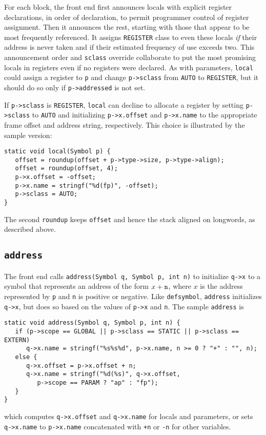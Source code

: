 For each block, the front end first announces locals with explicit
register declarations, in order of declaration, to permit programmer
control of register assignment. Then it announces the rest, starting
with those that appear to be most frequently referenced.  It assigns
\verb|REGISTER| class to even these locals {\em if} their address
is never taken and if their estimated frequency of use exceeds two.
This announcement order and \verb|sclass| override collaborate to put the most
promising locals in registers even if no registers were declared.  As
with parameters, \verb|local| could assign a register to \verb|p| and
change \verb|p->sclass| from \verb|AUTO| to \verb|REGISTER|, but it
should do so only if \verb|p->addressed| is not set.

If \verb|p->sclass| is \verb|REGISTER|, \verb|local|
can decline to allocate a register by setting \verb|p->sclass| to \verb|AUTO|
and initializing \verb|p->x.offset| and \verb|p->x.name| to the appropriate frame offset
and address string, respectively.
This choice is illustrated by the sample version:
\begin{verbatim}
static void local(Symbol p) {
   offset = roundup(offset + p->type->size, p->type->align);
   offset = roundup(offset, 4);
   p->x.offset = -offset;
   p->x.name = stringf("%d(fp)", -offset);
   p->sclass = AUTO;
}
\end{verbatim}
The second \verb|roundup| keeps \verb|offset| and hence the stack
aligned on longwords, as described above.

\subsection{\tt address}

\label{address}
The front end calls \verb|address(Symbol q, Symbol p, int n)| to
initialize \verb|q->x| to a symbol that represents an address of the form $x+{\tt n}$,
where $x$ is the address represented by \verb|p| and \verb|n| is positive or negative.
Like \verb|defsymbol|, \verb|address| initializes \verb|q->x|, but
does so based on the values of \verb|p->x| and \verb|n|.
The sample \verb|address| is
\begin{verbatim}
static void address(Symbol q, Symbol p, int n) {
   if (p->scope == GLOBAL || p->sclass == STATIC || p->sclass == EXTERN)
      q->x.name = stringf("%s%s%d", p->x.name, n >= 0 ? "+" : "", n);
   else {
      q->x.offset = p->x.offset + n;
      q->x.name = stringf("%d(%s)", q->x.offset,
         p->scope == PARAM ? "ap" : "fp");
   }
}
\end{verbatim}
which computes \verb|q->x.offset| and \verb|q->x.name| for locals and parameters,
or sets \verb|q->x.name| to \verb|p->x.name| concatenated with \verb|+n| or \verb|-n|
for other variables. 

